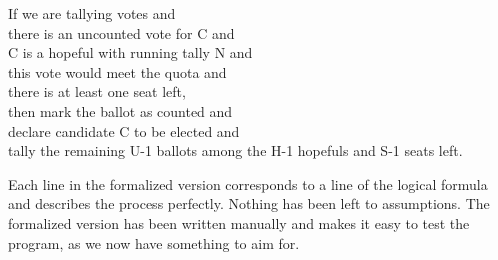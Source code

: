 \begin{texto} 
If we are tallying votes and \\
there is an uncounted vote for C and \\
C is a hopeful with running tally N and \\
this vote would meet the quota and \\
there is at least one seat left, \\
then mark the ballot as counted and \\
declare candidate C to be elected and \\
tally the remaining U-1 ballots among the H-1 hopefuls and S-1 seats left.
\end{texto}

Each line in the formalized version corresponds to a line of the logical formula and describes the process perfectly. Nothing has been left to assumptions. The formalized version has been written manually and makes it easy to test the program, as we now have something to aim for.